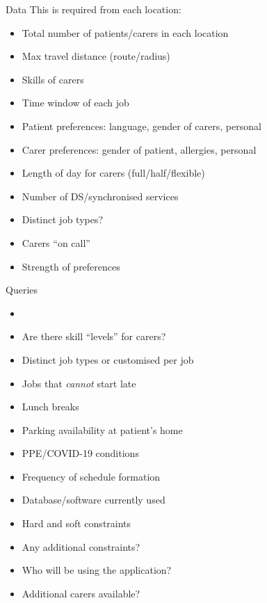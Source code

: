 \documentclass[usenames,dvipsnames]{beamer}
\begin{document}
\begin{frame}{Data}
This is required from each location:
\footnotesize
\begin{multicols}{2}
	\begin{itemize}
		\item Total number of patients/carers in each location
		\item Max travel distance (route/radius)
		\item Skills of carers
		\item Time window of each job
		\item Patient preferences: language, gender of carers, personal
		\item Carer preferences: gender of patient, allergies, personal
		\item Length of day for carers (full/half/flexible)
		\item Number of DS/synchronised services
		\item Distinct job types?
		\item Carers ``on call''
		\item Strength of preferences
	\end{itemize}	
\end{multicols}	
\end{frame}

\begin{frame}{Queries}
\scriptsize
	\begin{itemize}
		\item {}
		\item Are there skill ``levels'' for carers?
		\item Distinct job types or customised per job
		\item Jobs that \emph{cannot} start late
		\item Lunch breaks
		\item Parking availability at patient's home
		\item PPE/COVID-19 conditions
		\item Frequency of schedule formation
		\item Database/software currently used
		\item Hard and soft constraints
		\item Any additional constraints?
		\item Who will be using the application?
		\item Additional carers available?
	\end{itemize}	
\end{frame}
\end{document}
